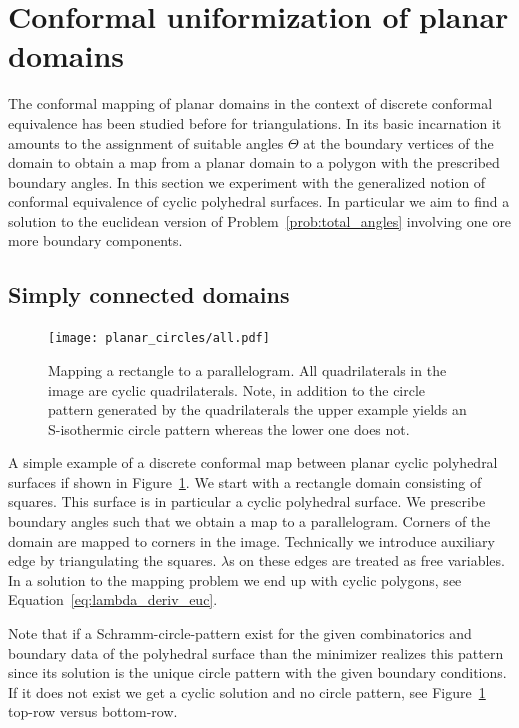 \documentclass[Thesis]{subfiles}
\begin{document}
\section{Conformal uniformization of planar domains}
\label{sec:planar_domains}

The conformal mapping of planar domains in the context of discrete conformal equivalence has been studied before for triangulations. 
In its basic incarnation it amounts to the assignment of suitable angles $\Theta$ at the boundary vertices of the domain to obtain a map from a planar domain to a polygon with the prescribed boundary angles. 
In this section we experiment with the generalized notion of conformal equivalence of cyclic polyhedral surfaces.
In particular we aim to find a solution to the euclidean version of Problem~\ref{prob:total_angles} involving one ore more boundary components.

\subsection{Simply connected domains}

\begin{figure}
\centering
\texttt{[image: planar\_circles/all.pdf]}
\\
\caption{
Mapping a rectangle to a parallelogram.
All quadrilaterals in the image are cyclic quadrilaterals.
Note, in addition to the circle pattern generated by the quadrilaterals the upper example yields an S-isothermic circle pattern whereas the lower one does not.
}
\label{fig:cyclic_parallelogram}
\end{figure}

A simple example of a discrete conformal map between planar cyclic polyhedral surfaces if shown in Figure~\ref{fig:cyclic_parallelogram}. 
We start with a rectangle domain consisting of squares. 
This surface is in particular a cyclic polyhedral surface. 
We prescribe boundary angles such that we obtain a map to a parallelogram.
Corners of the domain are mapped to corners in the image. 
Technically we introduce auxiliary edge by triangulating the squares. $\lambda$s on these edges are treated as free variables. 
In a solution to the mapping problem we end up with cyclic polygons, see Equation~\ref{eq:lambda_deriv_euc}.

Note that if a Schramm-circle-pattern \cite{S97} exist for the given combinatorics and boundary data of the polyhedral surface than the minimizer realizes this pattern since its solution is the unique circle pattern with the given boundary conditions.
If it does not exist we get a cyclic solution and no circle pattern, see Figure~\ref{fig:cyclic_parallelogram} top-row versus bottom-row.
\end{document}
